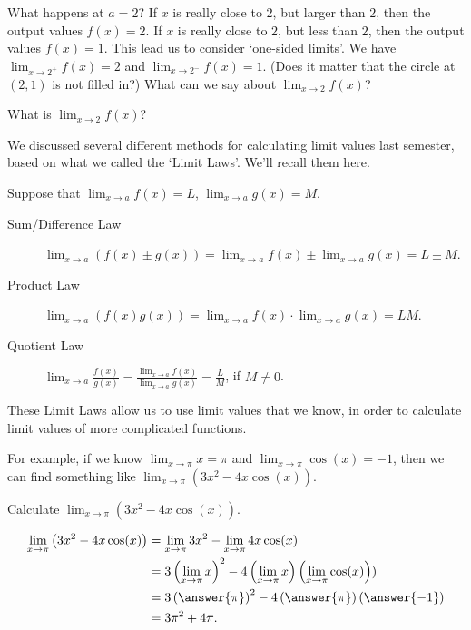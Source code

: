 \documentclass{ximera}
\begin{document}
What happens at $a = 2$?  If $x$ is really close to $2$, but larger than $2$, then the output values $f(x) = 2$.  If
$x$ is really close to $2$, but less than $2$, then the output values $f(x) = 1$.  This lead us to consider 
`one-sided limits'.  We have $\displaystyle \lim_{x\to 2^+} f(x) = 2$ and $\displaystyle \lim_{x\to 2^-} f(x) = 1$.  (Does it
matter that the circle at $(2,1)$ is not filled in?)
What can we say about $\displaystyle \lim_{x\to 2} f(x)$?
\begin{question}
	What is $\displaystyle \lim_{x\to 2} f(x)$?
	\begin{multipleChoice}
	\end{multipleChoice}
\end{question}


We discussed several different methods for calculating limit values last semester, based on what we called the `Limit Laws'. We'll recall them here.
\begin{theorem}
Suppose that $\lim_{x\to a}f(x)=L$, $\lim_{x\to a}g(x)=M$.
	\begin{description}
		\item[Sum/Difference Law] $\lim_{x\to a} (f(x) \pm g(x)) = \lim_{x\to a}f(x) \pm \lim_{x\to a}g(x)=L \pm M$.
		\item[Product Law]  $\lim_{x\to a} (f(x)g(x)) = \lim_{x\to a}f(x)\cdot\lim_{x\to a}g(x)=LM$.
		\item[Quotient Law]  $\lim_{x\to a} \frac{f(x)}{g(x)} = \frac{\lim_{x\to a}f(x)}{\lim_{x\to a}g(x)}=\frac{L}{M}$, if $M\ne0$.
	\end{description}
\end{theorem}
These Limit Laws allow us to use limit values that we know, in order to calculate limit values of more complicated functions.

For example, if we know $\displaystyle \lim_{x\to \pi} x = \pi$ and $\displaystyle \lim_{x\to \pi} \cos(x) = -1$, then we can find
something like $\displaystyle \lim_{x\to \pi} \left(3x^2 - 4x \cos(x)\right)$.
\begin{example}
Calculate $\displaystyle \lim_{x\to \pi} \left(3x^2 - 4x \cos(x)\right)$.
	\begin{explanation}
		\begin{align*}
			\lim_{x\to \pi} \left(3x^2 - 4x \cos(x)\right) &= \lim_{x\to \pi} 3x^2 - \lim_{x\to \pi} 4x \cos(x)\\
				&= 3 \left(\lim_{x\to \pi} x \right)^2 - 4 \left( \lim_{x\to \pi} x \right) \left( \lim_{x\to \pi} \cos(x) \right)) \\
				&= 3 \left( \answer{\pi} \right)^2 - 4 \left( \answer{\pi} \right) \left( \answer{-1} \right)\\
				&= 3\pi^2 + 4\pi.
		\end{align*}
	\end{explanation}
\end{example}
\end{document}
